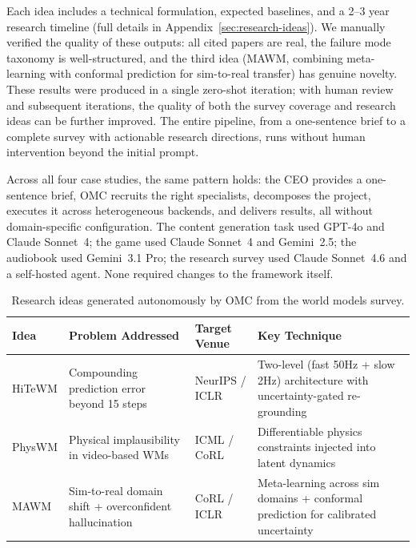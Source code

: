 \documentclass[11pt,a4paper]{article}
\begin{document}
\noindent Each idea includes a technical formulation, expected baselines, and a 2--3 year research timeline (full details in Appendix~\ref{sec:research-ideas}).  We manually verified the quality of these outputs: all cited papers are real, the failure mode taxonomy is well-structured, and the third idea (MAWM, combining meta-learning with conformal prediction for sim-to-real transfer) has genuine novelty.  These results were produced in a single zero-shot iteration; with human review and subsequent iterations, the quality of both the survey coverage and research ideas can be further improved.  The entire pipeline, from a one-sentence brief to a complete survey with actionable research directions, runs without human intervention beyond the initial prompt.

Across all four case studies, the same pattern holds: the CEO provides a one-sentence brief, OMC recruits the right specialists, decomposes the project, executes it across heterogeneous backends, and delivers results, all without domain-specific configuration.  The content generation task used GPT-4o and Claude Sonnet~4; the game used Claude Sonnet~4 and Gemini~2.5; the audiobook used Gemini~3.1 Pro; the research survey used Claude Sonnet~4.6 and a self-hosted agent.  None required changes to the framework itself.

\begin{table}[t]
\centering
\caption{Research ideas generated autonomously by OMC from the world models survey.}
\label{tab:research-ideas}
\small
\setlength{\tabcolsep}{3pt}
\begin{tabularx}{\textwidth}{@{}>{\raggedright\arraybackslash}p{2.8cm}>{\raggedright\arraybackslash}p{3.5cm}>{\raggedright\arraybackslash}p{2.2cm}X@{}}
\toprule
\textbf{Idea} & \textbf{Problem Addressed} & \textbf{Target Venue} & \textbf{Key Technique} \\
\midrule
HiTeWM & Compounding prediction error beyond 15 steps & NeurIPS / ICLR & Two-level (fast 50Hz + slow 2Hz) architecture with uncertainty-gated re-grounding \\
\addlinespace
PhysWM & Physical implausibility in video-based WMs & ICML / CoRL & Differentiable physics constraints injected into latent dynamics \\
\addlinespace
MAWM & Sim-to-real domain shift + overconfident hallucination & CoRL / ICLR & Meta-learning across sim domains + conformal prediction for calibrated uncertainty \\
\bottomrule
\end{tabularx}
\end{table}
\end{document}
